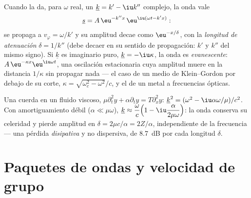 \begin{definition}\label{def:b2:dispersion-wave-packets:complex}
Cuando la  da, para $\omega$ real, un
$\underline k = k' - \iu k''$ complejo, la onda vale
\[
\underline s = A\,\eu^{-k''x}\,\eu^{\iu(\omega t - k'x)} :
\]
se propaga a $v_\varphi = \omega/k'$ y su amplitud decae como
$\eu^{-x/\delta}$, con la \emph{longitud de atenuación} $\delta = 1/k''$ (debe
decaer en su sentido de propagación: $k'$ y $k''$ del mismo signo).
Si $\underline k$ es imaginario puro, $\underline k = -\iu\kappa$, la onda es
\emph{evanescente}: $A\,\eu^{-\kappa x}\eu^{\iu\omega t}$, una oscilación
estacionaria cuya amplitud muere en la distancia $1/\kappa$ sin propagar
nada --- el caso de un medio de Klein--Gordon por debajo de su corte,
$\kappa = \sqrt{\omega_c^2 - \omega^2}/c$, y el de un metal a frecuencias ópticas.
\end{definition}

\begin{example}\label{ex:b2:dispersion-wave-packets:damped}
Una cuerda en un fluido viscoso, $\mu\partial_t^2y + \alpha\partial_ty = T\partial_x^2y$:
$\underline k^2 = (\omega^2 - \iu\alpha\omega/\mu)/c^2$. Con amortiguamiento débil ($\alpha \ll \mu
\omega$), $\underline k \approx \dfrac\omega c\Bigl(1 - \iu\dfrac{\alpha}{2\mu\omega}\Bigr)$: la onda
conserva su celeridad y pierde amplitud en $\delta = 2\mu c/\alpha = 2Z/\alpha$,
independiente de la frecuencia --- una pérdida \emph{disipativa} y no dispersiva,
de \qty{8.7}{dB} por cada longitud $\delta$.
\end{example}

\section{Paquetes de ondas y velocidad de grupo}

